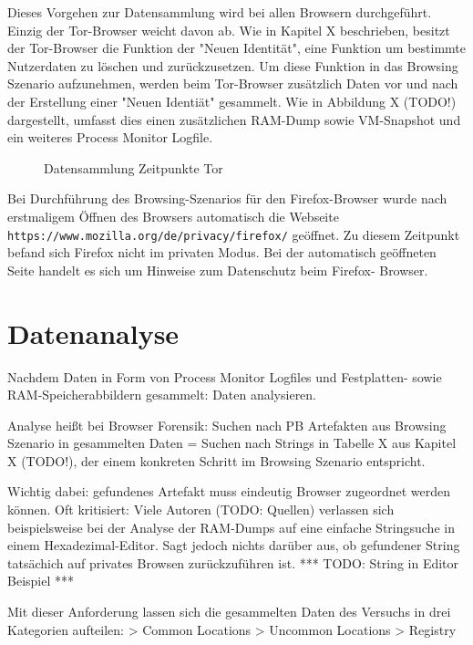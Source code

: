 Dieses Vorgehen zur Datensammlung wird bei allen Browsern durchgeführt. Einzig der Tor-Browser weicht davon ab. Wie in Kapitel X beschrieben, besitzt der Tor-Browser die Funktion der "Neuen Identität", eine Funktion um bestimmte Nutzerdaten zu löschen und zurückzusetzen.
Um diese Funktion in das Browsing Szenario aufzunehmen, werden beim Tor-Browser zusätzlich Daten vor und nach der Erstellung einer "Neuen Identiät" gesammelt. Wie in Abbildung X (TODO!) dargestellt, umfasst dies einen zusätzlichen RAM-Dump sowie VM-Snapshot und ein weiteres Process Monitor Logfile.
\begin{figure}[h!]
	\centering
	\small
	\centerline{\resizebox{\linewidth}{!}{}}
	\caption{Datensammlung Zeitpunkte Tor}
	\label{fig:jes}
\end{figure}
	
Bei Durchführung des Browsing-Szenarios für den Firefox-Browser wurde nach erstmaligem Öffnen des Browsers automatisch die Webseite \texttt{https://www.mozilla.org/de/privacy/firefox/} geöffnet. Zu diesem Zeitpunkt befand sich Firefox nicht im privaten Modus. Bei der automatisch geöffneten Seite handelt es sich um Hinweise zum Datenschutz beim Firefox- Browser.

\section{Datenanalyse}

Nachdem Daten in Form von Process Monitor Logfiles und Festplatten- sowie RAM-Speicherabbildern gesammelt: Daten analysieren.

Analyse heißt bei Browser Forensik: Suchen nach PB Artefakten aus Browsing Szenario in gesammelten Daten
 = Suchen nach Strings in Tabelle X aus Kapitel X (TODO!), der einem konkreten Schritt im Browsing Szenario entspricht.

Wichtig dabei: gefundenes Artefakt muss eindeutig Browser zugeordnet werden können.
Oft kritisiert: Viele Autoren (TODO: Quellen) verlassen sich beispielsweise bei der Analyse der RAM-Dumps auf eine einfache Stringsuche in einem Hexadezimal-Editor.
Sagt jedoch nichts darüber aus, ob gefundener String tatsächich auf privates Browsen zurückzuführen ist.
*** TODO: String in Editor Beispiel ***

Mit dieser Anforderung lassen sich die gesammelten Daten des Versuchs in drei Kategorien aufteilen:
> Common Locations
> Uncommon Locations	
> Registry

